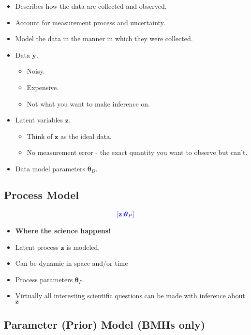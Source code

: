 \documentclass[]{book}
\begin{document}
\begin{itemize}
\item
  Describes how the data are collected and observed.
\item
  Account for measurement process and uncertainty.
\item
  Model the data in the manner in which they were collected.
\item
  Data \(\mathbf{y}\).

  \begin{itemize}
  \item
    Noisy.
  \item
    Expensive.
  \item
    Not what you want to make inference on.
  \end{itemize}
\item
  Latent variables \(\mathbf{z}\).

  \begin{itemize}
  \item
    Think of \(\mathbf{z}\) as the ideal data.
  \item
    No measurement error - the exact quantity you want to observe but can't.
  \end{itemize}
\item
  Data model parameters \(\boldsymbol{\theta}_D\).
\end{itemize}

\hypertarget{process-model}{%
\subsection{Process Model}\label{process-model}}

\begin{align*}
\color{blue}{[\mathbf{z} | \boldsymbol{\theta}_P]} 
\end{align*}

\begin{itemize}
\item
  \textbf{Where the science happens!}
\item
  Latent process \(\mathbf{z}\) is modeled.
\item
  Can be dynamic in space and/or time
\item
  Process parameters \(\boldsymbol{\theta}_P\).
\item
  Virtually all interesting scientific questions can be made with inference about \(\mathbf{z}\)
\end{itemize}

\hypertarget{parameter-prior-model-bmhs-only}{%
\subsection{Parameter (Prior) Model (BMHs only)}\label{parameter-prior-model-bmhs-only}}
\end{document}
